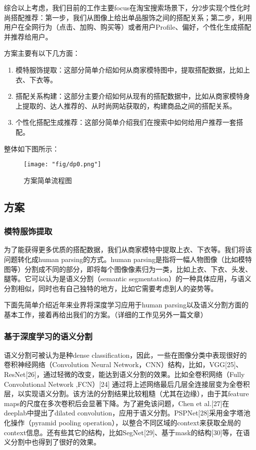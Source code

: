 \par 综合以上考虑，我们目前的工作主要focus在淘宝搜索场景下，分2步实现个性化时尚搭配推荐：第一步，我们从图像上给出单品服饰之间的搭配关系；第二步，利用用户在全网行为（点击、加购、购买等）或者用户Profile、偏好，个性化生成搭配并推荐给用户。

方案主要有以下几方面：
\begin{enumerate}
\item 模特服饰提取：这部分简单介绍如何从商家模特图中，提取搭配数据，比如上衣、下衣等。
\item 搭配关系构建：这部分主要介绍如何从现有的搭配数据中，比如从商家模特身上提取的、达人推荐的、从时尚网站获取的，构建商品之间的搭配关系。
\item 个性化搭配生成推荐：这部分简单介绍我们在搜索中如何给用户推荐一套搭配。
\end{enumerate}

整体如下图所示：
\begin{figure}[!h]
	\centering
	\texttt{[image: "fig/dp0.png"]}
	\caption{方案简单流程图}
	\label{fig:dp0}
\end{figure}

\subsection{方案}
\subsubsection{模特服饰提取}
为了能获得更多优质的搭配数据，我们从商家模特中提取上衣、下衣等。我们将该问题转化成human parsing的方式。human parsing是指将一幅人物图像（比如模特图等）分割成不同的部分，即将每个图像像素归为一类，比如上衣、下衣、头发、腿等。它可以认为是语义分割（semantic segmentation）的一种具体应用，与语义分割相似，同时也有自己独特的地方，比如它需要考虑到人的姿势等。

\par 下面先简单介绍近年来业界将深度学习应用于human parsing以及语义分割方面的基本工作，接着再给出我们的方案。（详细的工作见另外一篇文章）

\subsubsection{基于深度学习的语义分割}
语义分割可被认为是种dense classification，因此，一些在图像分类中表现很好的卷积神经网络（Convolution Neural Network，CNN）结构，比如，VGG[25]、ResNet[26]，通过轻微的改变，能达到语义分割的效果。比如全卷积网络（Fully Convolutional Network ,FCN）[24] 通过将上述网络最后几层全连接层变为全卷积层，以实现语义分割。该方法的分割结果比较粗糙（尤其在边缘），由于其feature maps的尺度在多次卷积后会显著下降。为了避免该问题，Chen et al.[27]在deeplab中提出了dilated convolution，应用于语义分割。PSPNet[28]采用金字塔池化操作（pyramid pooling operation），以整合不同区域的context来获取全局的context信息。还有些其它的结构，比如SegNet[29]、基于mask的结构[30]等，在语义分割中也得到了很好的效果。

